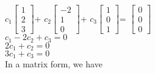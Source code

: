 \documentclass[12pt,a4paper]{article}
\begin{document}
$c_1\begin{bmatrix}
1\\2\\3
\end{bmatrix}$+ $c_2\begin{bmatrix}
-2\\1\\0
\end{bmatrix}$+ $c_3\begin{bmatrix}
1\\0\\1
\end{bmatrix}$= $\begin{bmatrix}
0\\0\\0
\end{bmatrix}$\vspace{5mm}\\
$c_1 - 2c_2  + c_3 = 0$\\
$2c_1 + c_2  = 0$\\
$3c_1  + c_3 = 0$\vspace{5mm}\\
In a matrix form,  we have\vspace{5mm}\\
\end{document}
